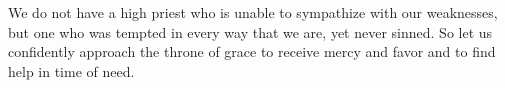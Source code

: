\lettrine[lines=3]{W}{}e do not have a high priest who is unable to sympathize with our weaknesses, but one who was tempted in every way that we are, yet never sinned. So let us confidently approach the throne of grace to receive mercy and favor and to find help in time of need.